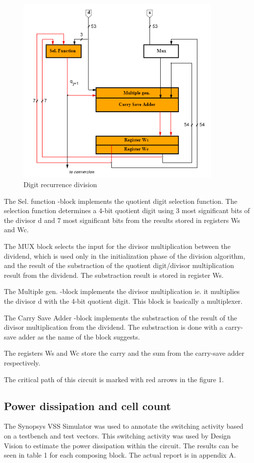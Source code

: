 \documentclass[11pt,a4paper]{article}
\begin{document}
\begin{figure}
	\centering
		\includegraphics[width=4in]{./noretiming.PNG}
	\caption{Digit recurrence division}	\label{fig:noretiming}
\end{figure}

\FloatBarrier

The Sel. function -block implements the quotient digit selection function. The selection function determines a 4-bit quotient digit using 3 most significant bits of the divisor d and 7 most significant bits from the results stored in registers Ws and Wc.

The MUX block selects the input for the divisor multiplication between the dividend, which is used only in the initialization phase of the division algorithm, and the result of the substraction of the quotient digit/divisor multiplication result from the dividend. The substraction result is stored in register Ws.

The Multiple gen. -block implements the divisor multiplication ie. it multiplies the divisor d with the 4-bit quotient digit. This block is basically a multiplexer.

The Carry Save Adder -block implements the substraction of the result of the divisor multiplication from the dividend. The substraction is done with a carry-save adder as the name of the block suggests.

The registers Ws and Wc store the carry and the sum from the carry-save adder respectively.

The critical path of this circuit is marked with red arrows in the figure 1.

\subsection{Power dissipation and cell count}
The Synopsys VSS Simulator was used to annotate the switching activity based on a testbench and test vectors. This switching activity was used by Design Vision to estimate the power dissipation within the circuit. The results can be seen in table 1 for each composing block. The actual report is in appendix A.
\end{document}
